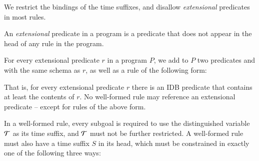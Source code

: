 We restrict the bindings of the time suffixes, and
disallow {\em extensional} predicates in most rules.



\begin{definition}
%
An \emph{extensional} predicate in a \lang program is a predicate
that does not appear in the head of any rule in the program.  
%
\end{definition}


For every extensional predicate $r$ in a \lang program $P$, we add to $P$ two
predicates  and  with the same schema as $r$, as well as a rule
of the following form:


That is, for every extensional predicate $r$ there is an IDB predicate  that
contains at least the contents of $r$.  No well-formed \lang rule may reference
an extensional predicate -- except for rules of the above
form.

In a well-formed \lang rule, every subgoal is required to use the
distinguished variable $\Tau$ as its time suffix, and $\Tau$ must not be
further restricted.  A well-formed \slang rule must also have a time suffix
$S$ in its head, which must be constrained in exactly one of the following
three ways:

